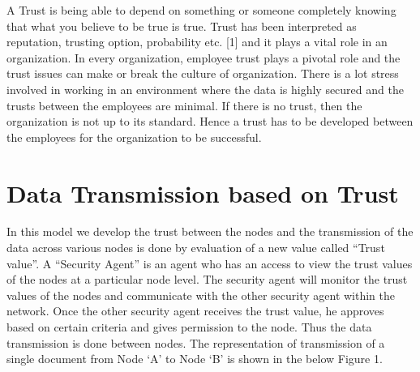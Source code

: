 A Trust is being able to depend on something or someone completely knowing that what you believe to be true is true. Trust has been interpreted as reputation, trusting option, probability etc. [1] and it plays a vital role in an organization. 
In every organization, employee trust plays a pivotal role and the trust issues can make or break the culture of organization. There is a lot stress involved in working in an environment where the data is highly secured and the trusts between the employees are minimal.  If there is no trust, then the organization is not up to its standard. Hence a trust has to be developed between the employees for the organization to be successful. 

\section{Data Transmission based on Trust}
In this model we develop the trust between the nodes and the transmission of the data across various nodes is done by evaluation of a new value called “Trust value”. A “Security Agent” is an agent who has an access to view the trust values of the nodes at a particular node level. The security agent will monitor the trust values of the nodes and communicate with the other security agent within the network. Once the other security agent receives the trust value, he approves based on certain criteria and gives permission to the node. Thus the data transmission is done between nodes. The representation of transmission of a single document from Node ‘A’ to Node ‘B’ is shown in the below Figure 1.


